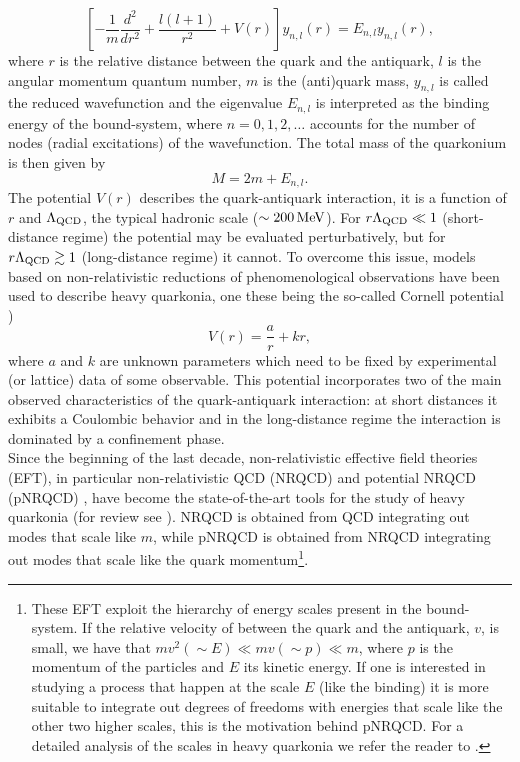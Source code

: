 \documentclass[10pt, a4paper, twocolumn]{article}
\begin{document}
\begin{equation}\label{reduced}
    \left[-\frac{1}{m}\frac{d^2}{dr^2}+\frac{l(l+1)}{r^2}+V(r)\right]y_{n,l}(r)=E_{n,l}y_{n,l}(r), 
\end{equation} where $r$ is the relative distance between the quark and the antiquark, $l$ is the angular momentum quantum number, $m$ is the (anti)quark mass, $y_{n,l}$ is called the reduced wavefunction and the eigenvalue $E_{n,l}$ is interpreted as the binding energy of the bound-system, where $n=0,1,2,\dots$ accounts for the number of nodes (radial excitations) of the wavefunction. The total mass of the quarkonium is then given by
\begin{equation}\label{lomass}
    M=2m+E_{n,l}.
\end{equation} The potential $V(r)$ describes the quark-antiquark interaction, it is a function of $r$ and $\Lambda_{\rm QCD}$, the typical hadronic scale ($\sim 200\,{\rm MeV}$). For $r\Lambda_{\rm QCD} \ll 1$ (short-distance regime) the potential may be evaluated perturbatively, but for $r\Lambda_{\rm QCD} \gtrsim 1$ (long-distance regime) it cannot. To overcome this issue, models based on non-relativistic reductions of phenomenological observations have been used to describe heavy quarkonia, one these being the so-called Cornell potential \cite{Eichten:1974af,Eichten:1978tg,Eichten:1979ms}) 
\begin{equation}\label{cornell}
    V(r) = \frac{a}{r}+kr,
\end{equation} where $a$ and $k$ are unknown parameters which need to be fixed by experimental (or lattice) data of some observable. This potential incorporates two of the main observed characteristics of the quark-antiquark interaction: at short distances it exhibits a Coulombic behavior and in the long-distance regime the interaction is dominated by a confinement phase.\\
Since the beginning of the last decade, non-relativistic effective field theories (EFT), in particular non-relativistic QCD (NRQCD) \cite{Caswell:1985ui,Bodwin:1994jh} and potential NRQCD (pNRQCD) \cite{Brambilla:1999xf}, have become the state-of-the-art tools for the study of heavy quarkonia (for review see \cite{Brambilla:2004jw}). NRQCD is obtained from QCD integrating out modes that scale like $m$, while pNRQCD is obtained from NRQCD integrating out modes that scale like the quark momentum\footnote{These EFT exploit the hierarchy of energy scales present in the bound-system. If the relative velocity of between the quark and the antiquark, $v$, is small, we have that $mv^2(\sim E)\ll mv(\sim p) \ll m$, where $p$ is the momentum of the particles and $E$ its kinetic energy. If one is interested in studying a process that happen at the scale $E$ (like the binding) it is more suitable to integrate out degrees of freedoms with energies that scale like the other two higher scales, this is the motivation behind pNRQCD. For a detailed analysis of the scales in heavy quarkonia we refer the reader to \cite{Brambilla:2004jw}.}.
\end{document}
